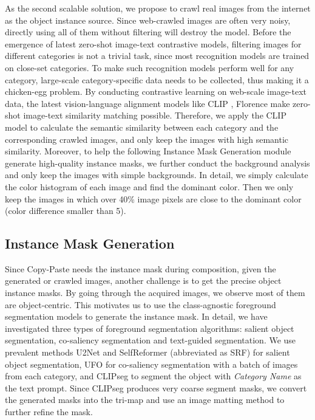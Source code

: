 \documentclass{article}
\begin{document}
As the second scalable solution, we propose to crawl real images from the internet as the object instance source. Since web-crawled images are often very noisy, directly using all of them without filtering will destroy the model. Before the emergence of latest zero-shot image-text contrastive models, filtering images for different categories is not a trivial task, since most recognition models are trained on close-set categories. To make such recognition models perform well for any category, large-scale category-specific data needs to be collected, thus making it a chicken-egg problem. By conducting contrastive learning on web-scale image-text data, the latest vision-language alignment models like CLIP \cite{CLIP}, Florence \cite{yuan2021florence} make zero-shot image-text similarity matching possible. Therefore, we apply the CLIP model to calculate the semantic similarity between each category and the corresponding crawled images, and only keep the images with high semantic similarity. Moreover, to help the following Instance Mask Generation module generate high-quality instance masks, we further conduct the background analysis and only keep the images with simple backgrounds. In detail, we simply calculate the color histogram of each image and find the dominant color. Then we only keep the images in which over 40\% image pixels are close to the dominant color (color difference smaller than 5).


\subsection{Instance Mask Generation}
\label{sec:instance_mask_generation}
Since Copy-Paste needs the instance mask during composition, given the generated or crawled images, another challenge is to get the precise object instance masks. By going through the acquired images, we observe most of them are object-centric. This motivates us to use the class-agnostic foreground segmentation models to generate the instance mask. In detail, we have investigated three types of foreground segmentation algorithms: salient object segmentation, co-saliency segmentation and text-guided segmentation. We use prevalent methods U2Net \cite{U2Net} and SelfReformer (abbreviated as SRF) \cite{selfreformer} for salient object segmentation, UFO \cite{UFO} for co-saliency segmentation with a batch of images from each category, and CLIPseg \cite{CLIPseg} to segment the object with \textit{Category Name} as the text prompt. Since CLIPseg \cite{CLIPseg} produces very coarse segment masks, we convert the generated masks into the tri-map and use an image matting method \cite{matteformer} to further refine the mask. 
\end{document}
